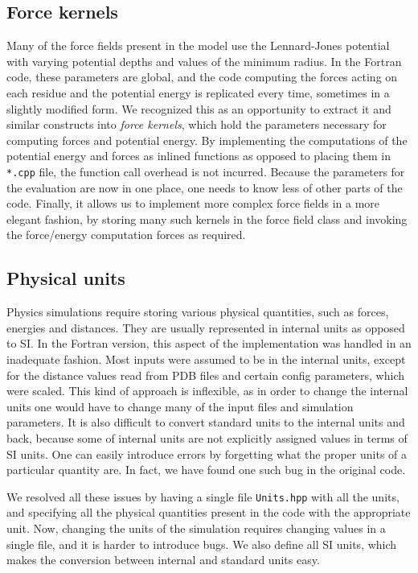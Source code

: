 \subsection{Force kernels}
Many of the force fields present in the model use the Lennard-Jones potential \cite{lj} with varying potential depths and values of the minimum radius. In the Fortran code, these parameters are global, and the code computing the forces acting on each residue and the potential energy is replicated every time, sometimes in a slightly modified form. We recognized this as an opportunity to extract it and similar constructs into \emph{force kernels}, which hold the parameters necessary for computing forces and potential energy. By implementing the computations of the potential energy and forces as inlined functions as opposed to placing them in \texttt{*.cpp} file, the function call overhead is not incurred. Because the parameters for the evaluation are now in one place, one needs to know less of other parts of the code. Finally, it allows us to implement more complex force fields in a more elegant fashion, by storing many such kernels in the force field class and invoking the force/energy computation forces as required.

\subsection{Physical units}
Physics simulations require storing various physical quantities, such as forces, energies and distances. They are usually represented in internal units as opposed to SI. In the Fortran version, this aspect of the implementation was handled in an inadequate fashion. Most inputs were assumed to be in the internal units, except for the distance values read from PDB files and certain config parameters, which were scaled. This kind of approach is inflexible, as in order to change the internal units one would have to change many of the input files and simulation parameters. It is also difficult to convert standard units to the internal units and back, because some of internal units are not explicitly assigned values in terms of SI units. One can easily introduce errors by forgetting what the proper units of a particular quantity are. In fact, we have found one such bug in the original code.

We resolved all these issues by having a single file \texttt{Units.hpp} with all the units, and specifying all the physical quantities present in the code with the appropriate unit. Now, changing the units of the simulation requires changing values in a single file, and it is harder to introduce bugs. We also define all SI units, which makes the conversion between internal and standard units easy.

